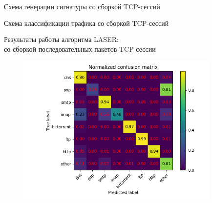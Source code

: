 \documentclass[10pt]{beamer}
\begin{document}
\begin{frame}{Схема генерации сигнатуры со сборкой TCP-сессий}
    \begin{figure}
        \begin{adjustwidth}{-2em}{-2em}
            \centering
            
        \end{adjustwidth}
    \end{figure}
\end{frame}

\begin{frame}{Схема классификации трафика со сборкой TCP-сессий}
    \begin{figure}
        \begin{adjustwidth}{-2em}{-2em}
            \centering
            
        \end{adjustwidth}
    \end{figure}
\end{frame}

\begin{frame}{Результаты работы алгоритма LASER: \\ со сборкой последовательных пакетов TCP-сессии}
    \begin{figure}
        \begin{adjustwidth}{-2em}{-2em}
            \centering
            \includegraphics[width=27em]{results/laser_reasm/Normalized_confusion_matrix.png}
        \end{adjustwidth}
    \end{figure}
\end{frame}
\end{document}

